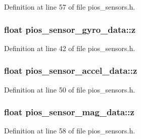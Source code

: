 Definition at line 57 of file pios\-\_\-sensors.\-h.

\hypertarget{group___p_i_o_s___s_e_n_s_o_r_s_ga54e998de17a4da6aa1f8504cce31a31c}{
\subsubsection[{z}]{\setlength{\rightskip}{0pt plus 5cm}float pios\-\_\-sensor\-\_\-gyro\-\_\-data\-::z}}\label{group___p_i_o_s___s_e_n_s_o_r_s_ga54e998de17a4da6aa1f8504cce31a31c}


Definition at line 42 of file pios\-\_\-sensors.\-h.

\hypertarget{group___p_i_o_s___s_e_n_s_o_r_s_ga8d801598e8a0f5aade459361b3ec9b7a}{
\subsubsection[{z}]{\setlength{\rightskip}{0pt plus 5cm}float pios\-\_\-sensor\-\_\-accel\-\_\-data\-::z}}\label{group___p_i_o_s___s_e_n_s_o_r_s_ga8d801598e8a0f5aade459361b3ec9b7a}


Definition at line 50 of file pios\-\_\-sensors.\-h.

\hypertarget{group___p_i_o_s___s_e_n_s_o_r_s_ga77b8adea9b5e8b43c3ce7d4c60784862}{
\subsubsection[{z}]{\setlength{\rightskip}{0pt plus 5cm}float pios\-\_\-sensor\-\_\-mag\-\_\-data\-::z}}\label{group___p_i_o_s___s_e_n_s_o_r_s_ga77b8adea9b5e8b43c3ce7d4c60784862}


Definition at line 58 of file pios\-\_\-sensors.\-h.


